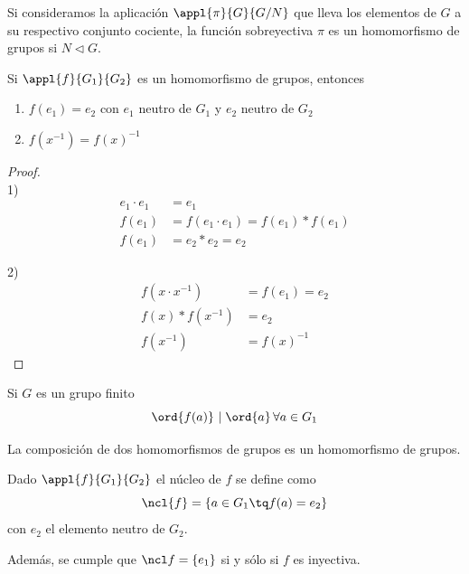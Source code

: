 \documentclass[a4paper,10pt]{apuntes}
\begin{document}
 \begin{example}
 Si consideramos la aplicación $\appl{\pi}{G}{G/N}$ que lleva los elementos de $G$ a su respectivo conjunto cociente, la función sobreyectiva $\pi$ es un homomorfismo de grupos si $N\lhd G$.
 \end{example}
 
 \begin{props} 
 Si $\appl{f}{G_1}{G_2}$ es un homomorfismo de grupos, entonces
 \begin{enumerate}
 \item $f(e_1) = e_2$ con $e_1$ neutro de $G_1$ y $e_2$ neutro de $G_2$
 \item $f(x^{-1}) = f(x)^{-1}$
 \end{enumerate}
 \end{props}
 
 \begin{proof} \\
 
 1) \begin{align*}  
 e_1\cdot e_1 &= e_1 \\
 f(e_1)& =f(e_1\cdot e_1) = f(e_1)\ast f(e_1) \\
 f(e_1) &= e_2 \ast e_2 = e_2
 \end{align*}

 2) \begin{align*}
 f(x\cdot x^{-1}) &= f(e_1) = e_2 \\ 
 f(x)\ast f(x^{-1}) &= e_2 \\
  f(x^{-1}) &= f(x)^{-1}
  \end{align*}
 
 \end{proof}
 

\begin{remark} Si $G$ es un grupo finito \[\ord{f(a)}\ |\;\ord{a}\, \forall a \in G_1 \] \end{remark}

\begin{lemma}
La composición de dos homomorfismos de grupos es un homomorfismo de grupos.
\end{lemma}

\begin{defn}
Dado $\appl{f}{G_1}{G_2}$ el núcleo de $f$ se define como 
\[ \ncl{f} = \{ a\in G_1 \tq f(a) = e_2\} \]
con $e_2$ el elemento neutro de $G_2$. 

Además, se cumple que $\ncl f = \{ e_1 \}$ si y sólo si $f$ es inyectiva.
\end{defn}
\end{document}
